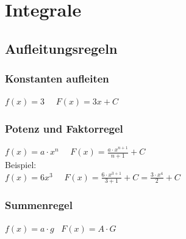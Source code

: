 \section{Integrale}

\subsection{Aufleitungsregeln}
\subsubsection{Konstanten aufleiten}
$
f(x) = 3$ \ \textrightarrow \ $ F(x) = 3x + C
$
\subsubsection{Potenz und Faktorregel}
$
f(x) = a \cdot x^n $ \ \textrightarrow \ $ F(x) = \frac{a \cdot x^{n+1}}{n + 1} + C
$
\\
Beispiel: \\
$
f(x) = 6x^3 $ \ \textrightarrow\ $ F(x) = \frac{6 \cdot x^{3+1}}{3 + 1} + C = \frac{3 \cdot x^4}{2} + C
$

\subsubsection{Summenregel}
$
f(x) = a \cdot g $ \textrightarrow\ $ F(x) = A \cdot G
$
